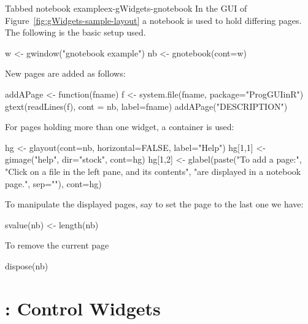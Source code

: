 \begin{example}{Tabbed notebook example}{ex-gWidgets-gnotebook}
 In the GUI of Figure~\ref{fig:gWidgets-sample-layout} a notebook is
 used to hold differing pages. The following is the basic setup used.
\begin{Schunk}
\begin{Sinput}
 w <- gwindow("gnotebook example")
 nb <- gnotebook(cont=w)
\end{Sinput}
\end{Schunk}

New pages are added as follows:
\begin{Schunk}
\begin{Sinput}
 addAPage <- function(fname) {
   f <- system.file(fname, package="ProgGUIinR")
   gtext(readLines(f), cont = nb, label=fname)
 }
 addAPage("DESCRIPTION")
\end{Sinput}
\end{Schunk}

For pages holding more than one widget, a container is used:
\begin{Schunk}
\begin{Sinput}
 hg <- glayout(cont=nb, horizontal=FALSE, label="Help")
 hg[1,1] <- gimage("help", dir="stock", cont=hg)
 hg[1,2] <- glabel(paste("To add a page:",
              "Click on a file in the left pane, and its contents",
              "are displayed in a notebook page.", sep="\n"), 
              cont=hg)
\end{Sinput}
\end{Schunk}


To manipulate the displayed pages, say to set the page to the last one
we have:
\begin{Schunk}
\begin{Sinput}
 svalue(nb) <- length(nb)
\end{Sinput}
\end{Schunk}
%
To remove the current page
\begin{Schunk}
\begin{Sinput}
 dispose(nb)
\end{Sinput}
\end{Schunk}
%
\end{example}






\chapter{: Control Widgets}
\label{cha:control-widgets}

